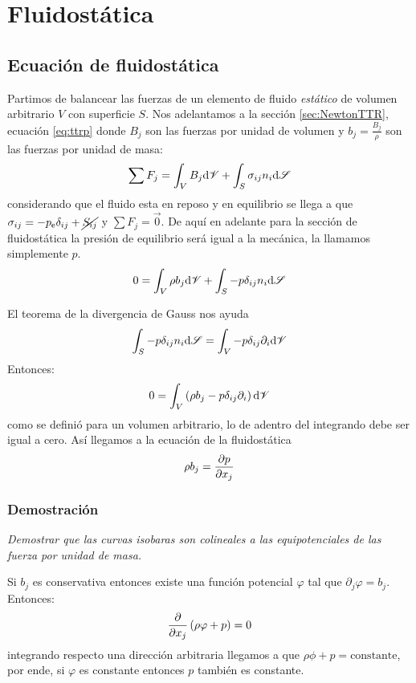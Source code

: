 
\section{Fluidostática}
\subsection{Ecuación de fluidostática}
Partimos de balancear las fuerzas de un elemento de fluido \textit{estático} de volumen arbitrario $V$ con superficie $S$. Nos adelantamos a la sección \ref{sec:NewtonTTR}, ecuación \ref{eq:ttrp} donde $B_j$ son las fuerzas por unidad de volumen y $b_j=\frac{B_j}{\rho}$ son las fuerzas por unidad de masa:
\[
\sum F_j = \int_V B_j \textrm{d} \mathscr{V} + \int_S \sigma_{ij} n_i \textrm{d} \mathscr{S}
\]
considerando que el fluido esta en reposo y en equilibrio se llega a que $\sigma_{ij}=-\pe \delta_{ij}+\cancel{S_{ij}}$ y $\sum F_j=\vec{0}$. De aquí en adelante para la sección de fluidostática la presión de equilibrio será igual a la mecánica, la llamamos simplemente $p$.
\[
0=\int_V \rho b_j \textrm{d} \mathscr{V} + \int_S -p\delta_{ij}n_i \textrm{d} \mathscr{S}
\]

El teorema de la divergencia de Gauss nos ayuda
\[
\int_S -p\delta_{ij}n_i \textrm{d} \mathscr{S} = \int_V -p \delta_{ij}\partial_i \textrm{d} \mathscr{V}
\]
Entonces:
\[
0=\int_V \left(\rho b_j - p\delta_{ij}\partial_i\right) \textrm{d} \mathscr{V}
\]
como se definió para un volumen arbitrario, lo de adentro del integrando debe ser igual a cero. Así llegamos a la ecuación de la fluidostática
\begin{equation} \label{eq:fluidostatica}
    \rho b_j = \frac{\partial p}{\partial x_j}
\end{equation}

\subsubsection*{Demostración}
\textit{Demostrar que las curvas isobaras son colineales a las equipotenciales de las fuerza por unidad de masa.}

Si $b_j$ es conservativa entonces existe una función potencial $\varphi$ tal que $\partial_j \varphi =b_j$. Entonces:
\[
\frac{\partial }{\partial x_j}\left(\rho \varphi +p \right) = 0
\]
integrando respecto una dirección arbitraria llegamos a que $\rho \phi+p=\textrm{constante}$, por ende, si $\varphi$ es constante entonces $p$ también es constante.

